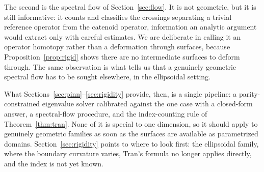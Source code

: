 \documentclass[11pt]{article}
\theoremstyle{definition}
\theoremstyle{plain}
\begin{document}
The second is the spectral flow of Section~\ref{sec:flow}. It is not geometric, but it is still informative: it counts and classifies the crossings separating a trivial reference operator from the catenoid operator, information an analytic argument would extract only with careful estimates. We are deliberate in calling it an operator homotopy rather than a deformation through surfaces, because Proposition~\ref{prop:rigid} shows there are no intermediate surfaces to deform through. The same observation is what tells us that a genuinely geometric spectral flow has to be sought elsewhere, in the ellipsoidal setting.

What Sections~\ref{sec:pinn}--\ref{sec:rigidity} provide, then, is a single pipeline: a parity-constrained eigenvalue solver calibrated against the one case with a closed-form answer, a spectral-flow procedure, and the index-counting rule of Theorem~\ref{thm:tran}. None of it is special to one dimension, so it should apply to genuinely geometric families as soon as the surfaces are available as parametrized domains. Section~\ref{sec:rigidity} points to where to look first: the ellipsoidal family, where the boundary curvature varies, Tran's formula no longer applies directly, and the index is not yet known.

\newpage

\newpage



\end{document}
